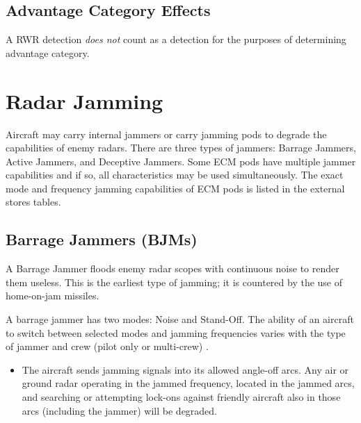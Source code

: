 \begin{advancedrules}
{        \subsection{Advantage Category Effects} A RWR detection \emph{does not} count as a detection for the purposes of determining advantage category.
    }

    \section{Radar Jamming}
    \label{rule:radar-jamming}

    Aircraft may carry internal jammers or carry jamming pods to degrade the capabilities of enemy radars. There are three types of jammers: Barrage Jammers, Active Jammers, and Deceptive Jammers. Some ECM pods have multiple jammer capabilities and if so, all characteristics may be used simultaneously. The exact mode and frequency jamming capabilities of ECM pods is listed in the external stores tables.


    \subsection{Barrage Jammers (BJMs)}
    \label{rule:home-on-jam-seeker}


    A Barrage Jammer floods enemy radar scopes with continuous noise to render them useless. This is the earliest type of jamming; it is countered by the use of home-on-jam missiles.

    A barrage jammer has two modes: Noise and Stand-Off. The ability of an aircraft to switch between selected modes and jamming frequencies varies with the type of jammer and crew (pilot only or multi-crew) .

    \begin{itemize}

        \item {} The aircraft sends jamming signals into its allowed angle-off arcs. Any air or ground radar operating in the jammed frequency, located in the jammed arcs, and searching or attempting lock-ons against friendly aircraft also in those arcs (including the jammer) will be degraded.


\end{itemize}
\end{advancedrules}
